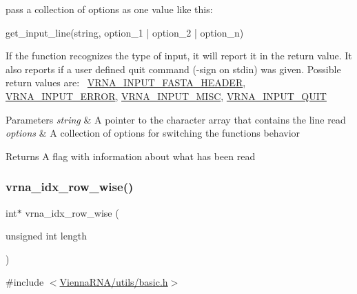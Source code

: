pass a collection of options as one value like this\+: \begin{DoxyVerb}get_input_line(string, option_1 | option_2 | option_n) \end{DoxyVerb}


If the function recognizes the type of input, it will report it in the return value. It also reports if a user defined \textquotesingle{}quit\textquotesingle{} command (-\/sign on \textquotesingle{}stdin\textquotesingle{}) was given. Possible return values are\+:~\newline
\mbox{\hyperlink{group__utils_ga2f0d8069e93d3ac54d9320d6bdb8e7e7}{V\+R\+N\+A\+\_\+\+I\+N\+P\+U\+T\+\_\+\+F\+A\+S\+T\+A\+\_\+\+H\+E\+A\+D\+ER}}, \mbox{\hyperlink{group__utils_gad403c9ea58f1836689404c2931419c8c}{V\+R\+N\+A\+\_\+\+I\+N\+P\+U\+T\+\_\+\+E\+R\+R\+OR}}, \mbox{\hyperlink{group__utils_ga8e3241b321c9c1a78a69e59e2e019a71}{V\+R\+N\+A\+\_\+\+I\+N\+P\+U\+T\+\_\+\+M\+I\+SC}}, \mbox{\hyperlink{group__utils_ga72f3c6ca5c83d2b9baed2922d19c403d}{V\+R\+N\+A\+\_\+\+I\+N\+P\+U\+T\+\_\+\+Q\+U\+IT}}


\begin{DoxyParams}{Parameters}
{\em string} & A pointer to the character array that contains the line read \\
\hline
{\em options} & A collection of options for switching the functions behavior \\
\hline
\end{DoxyParams}
\begin{DoxyReturn}{Returns}
A flag with information about what has been read 
\end{DoxyReturn}
\mbox{\label{group__utils_ga70b180e9ea764218a82647a1cd347445}} 
\subsubsection{\texorpdfstring{vrna\_idx\_row\_wise()}{vrna\_idx\_row\_wise()}}
{\footnotesize\ttfamily int$\ast$ vrna\+\_\+idx\+\_\+row\+\_\+wise (\begin{DoxyParamCaption}\item[{unsigned int}]{length }\end{DoxyParamCaption})}



{\ttfamily \#include $<$\mbox{\hyperlink{utils_2basic_8h}{Vienna\+R\+N\+A/utils/basic.\+h}}$>$}



